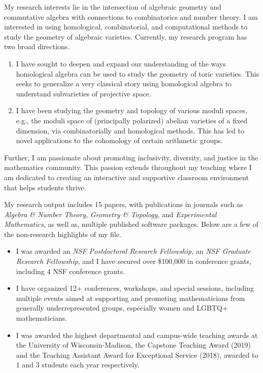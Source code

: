 \documentclass[11pt]{article}
\begin{document}
My research interests lie in the intersection of algebraic geometry and commutative algebra with connections to combinatorics and number theory. I am interested in using homological, combinatorial, and computational methods to study the geometry of algebraic varieties. Currently, my research program has two broad directions.
\begin{enumerate}[leftmargin=*,label=(\roman*)]
\item I have sought to deepen and expand our understanding of the ways homological algebra can be used to study the geometry of toric varieties. This seeks to generalize a very classical story using homological algebra to understand subvarieties of projective space.
\item I have been studying the geometry and topology of various moduli spaces, e.g., the moduli space of (principally polarized) abelian varieties of a fixed dimension, via combinatorially and homological methods. This has led to novel applications to the cohomology of certain arithmetic groups. 
\end{enumerate}
Further, I am passionate about promoting inclusivity, diversity, and justice in the mathematics community. This passion extends throughout my teaching where I am dedicated to creating an interactive and supportive classroom environment that helps students thrive.


My research output includes 15 papers, with publications in journals such as \textit{Algebra \& Number Theory}, \textit{Geometry \& Topology}, and \textit{Experimental Mathematics}, as well as, multiple published software packages. Below are a few of the non-research highlights of my file.

\begin{itemize}[leftmargin=*]
\item I was awarded an \textit{NSF Postdoctoral Research Fellowship}, an \textit{NSF Graduate Research Fellowship}, and I have secured over \$100,000 in conference grants, including 4 NSF conference grants. 
\item I have organized 12+ conferences, workshops, and special sessions, including multiple events aimed at supporting and promoting mathematicians from generally underrepresented groups, especially women and LGBTQ+ mathematicians. 
\item I was awarded the highest departmental and campus-wide teaching awards at the University of Wisconsin-Madison, the Capstone Teaching Award (2019) and the Teaching Assistant Award for Exceptional Service (2018), awarded to 1 and 3 students each year respectively. 
\end{itemize}
\end{document}
